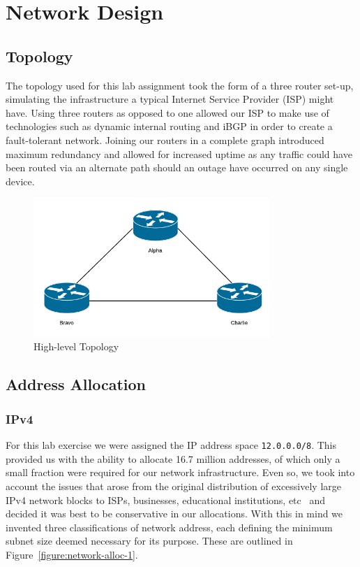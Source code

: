 \chapter{Network Design}

\section{Topology}

The topology used for this lab assignment took the form of a three router set-up,
simulating the infrastructure a typical Internet Service Provider (ISP)
might have. Using three routers as opposed to one allowed our ISP to make use
of technologies such as dynamic internal routing and iBGP in order to create a
fault-tolerant network. Joining our routers in a complete graph introduced
maximum redundancy and allowed for increased uptime as any traffic could have
been routed via an alternate path should an outage have occurred on any single
device.

\begin{figure}[!ht]
    \caption{High-level Topology}
    \centering
    \includegraphics[width=0.8\textwidth]{images/networkTopology.png}
\end{figure}

\section{Address Allocation}
\subsection{IPv4}
For this lab exercise we were assigned the IP address space
\texttt{12.0.0.0/8}. This provided us with the ability to allocate 16.7 million
addresses, of which only a small fraction were required for our network
infrastructure. Even so, we took into account the issues that arose from the
original distribution of excessively large IPv4 network blocks to ISPs,
businesses, educational institutions, etc~\cite{ipv4alloc}\cite{internetmap}
and decided it was best to be conservative in our allocations. With this in
mind we invented three classifications of network address, each defining the
minimum subnet size deemed necessary for its purpose. These are outlined in
Figure~\ref{figure:network-alloc-1}.

